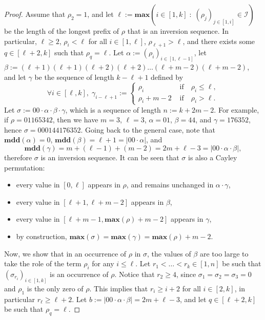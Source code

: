 \documentclass[a4paper,11pt]{article}
\theoremstyle{definition}
\theoremstyle{remark}
\newcommand{\I}{\mathcal{I}}
\renewcommand{\max}{\mathbf{max}}
\newcommand{\mdd}{\mathbf{mdd}}
\begin{document}
\begin{proof}
    Assume that $\rho_2 = 1$, and let $\ell := \max(i \in [1,k] \; : \; (\rho_j)_{j \in [1,i]} \in \I)$ be the length of the longest prefix of $\rho$ that is an inversion sequence. In particular, $\ell \geq 2$, $\rho_i < \ell$ for all $i \in [1,\ell]$, $\rho_{\ell+1} > \ell$, and there exists some $q \in [\ell+2,k]$ such that $\rho_q = \ell$.
    Let $\alpha := (\rho_i)_{i \in [1,\ell-1]}$, let $\beta := (\ell+1)(\ell+1)(\ell+2)(\ell+2) \dots (\ell+m-2)(\ell+m-2)$, and let $\gamma$ be the sequence of length $k-\ell+1$ defined by
    $$\forall i \in [\ell,k], \; \gamma_{i-\ell+1} := \begin{cases}
        \rho_{i} & \text{ if} \quad \rho_{i} \leq \ell, \\
        \rho_{i} + m-2 & \text{ if} \quad \rho_{i} > \ell.
    \end{cases}$$
    Let $\sigma := 00 \cdot \alpha \cdot \beta \cdot \gamma$, 
    which is a sequence of length $n := k+2m-2$. For example, if $\rho = 01165342$, then we have $m = 3$, $\ell = 3$, $\alpha = 01$, $\beta = 44$, and $\gamma = 176352$, hence $\sigma = 000144176352$.
    Going back to the general case, note that $\mdd(\alpha) = 0$, $\mdd(\beta) = \ell+1 = |00 \cdot\alpha|$, and $$\mdd(\gamma) = m+(\ell-1)+(m-2) = 2m+\ell-3 = |00 \cdot \alpha \cdot \beta|,$$ therefore $\sigma$ is an inversion sequence.
    It can be seen that $\sigma$ is also a Cayley permutation:
    \begin{itemize}
        \item every value in $[0, \ell]$ appears in $\rho$, and remains unchanged in $\alpha \cdot \gamma$,
        \item every value in $[\ell+1, \ell+m-2]$ appears in $\beta$,
        \item every value in $[\ell+m-1, \max(\rho)+m-2]$ appears in $\gamma$,
        \item by construction, $\max(\sigma) = \max(\gamma) = \max(\rho)+m-2$.
    \end{itemize}
    Now, we show that in an occurrence of $\rho$ in $\sigma$, the values of $\beta$ are too large to take the role of the term $\rho_i$ for any $i \leq \ell$. Let $r_1 < \dots < r_k \in [1,n]$ be such that $(\sigma_{r_i})_{i \in [1,k]}$ is an occurrence of $\rho$. Notice that $r_2 \geq 4$, since $\sigma_1 = \sigma_2 = \sigma_3 = 0$ and $\rho_1$ is the only zero of $\rho$. This implies that $r_i \geq i+2$ for all $i \in [2,k]$, in particular $r_{\ell} \geq \ell+2$. Let $b := |00 \cdot \alpha \cdot \beta| = 2m+\ell-3$, and let $q \in [\ell+2,k]$ be such that $\rho_q = \ell$.

\end{proof}
\end{document}
